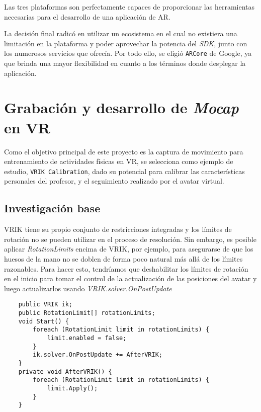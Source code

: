 Las tres plataformas son perfectamente capaces de proporcionar las herramientas necesarias para el desarrollo de una aplicación de AR.

La decisión final radicó en utilizar un ecosistema en el cual no existiera una limitación en la plataforma y poder aprovechar la potencia del \textit{SDK}, junto con los numerosos servicios que ofrecía. Por todo ello, se eligió \texttt{ARCore} de Google, ya que brinda una mayor flexibilidad en cuanto a los términos donde desplegar la aplicación.

\section{Grabación y desarrollo de \textit{Mocap} en VR}
\label{cap5:sec:capitulo5}

Como el objetivo principal de este proyecto es la captura de movimiento para entrenamiento de actividades físicas en VR, se selecciona como ejemplo de estudio, \texttt{VRIK Calibration}, dado su potencial para calibrar las características personales del profesor, y el seguimiento realizado por el avatar virtual.

\subsection{Investigación base}

VRIK tiene su propio conjunto de restricciones integradas y los límites de rotación no se pueden utilizar en el proceso de resolución. Sin embargo, es posible aplicar \textit{RotationLimits} encima de VRIK, por ejemplo, para asegurarse de que los huesos de la mano no se doblen de forma poco natural más allá de los límites razonables. Para hacer esto, tendríamos que deshabilitar los límites de rotación en el inicio para tomar el control de la actualización de las posiciones del avatar y luego actualizarlos usando \textit{VRIK.solver.OnPostUpdate}

\begin{lstlisting}
    public VRIK ik;
    public RotationLimit[] rotationLimits;
    void Start() {
        foreach (RotationLimit limit in rotationLimits) {
            limit.enabled = false;
        }
        ik.solver.OnPostUpdate += AfterVRIK;
    }
    private void AfterVRIK() {
        foreach (RotationLimit limit in rotationLimits) {
            limit.Apply();
        }
    }
\end{lstlisting}


